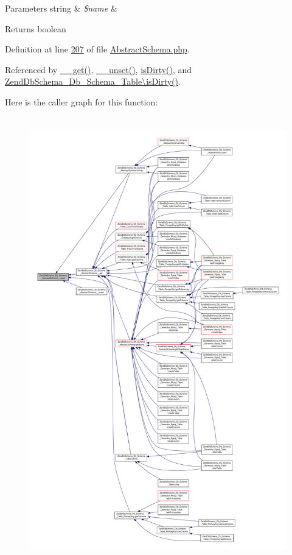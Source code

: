 \begin{DoxyParams}[1]{Parameters}
string & {\em \$name} & \\
\hline
\end{DoxyParams}
\begin{DoxyReturn}{Returns}
boolean 
\end{DoxyReturn}


Definition at line \hyperlink{AbstractSchema_8php_source_l00207}{207} of file \hyperlink{AbstractSchema_8php_source}{Abstract\-Schema.\-php}.



Referenced by \hyperlink{AbstractSchema_8php_source_l00193}{\-\_\-\-\_\-get()}, \hyperlink{AbstractSchema_8php_source_l00230}{\-\_\-\-\_\-unset()}, \hyperlink{AbstractSchema_8php_source_l00091}{is\-Dirty()}, and \hyperlink{Table_8php_source_l00365}{Zend\-Db\-Schema\-\_\-\-Db\-\_\-\-Schema\-\_\-\-Table\textbackslash{}is\-Dirty()}.



Here is the caller graph for this function\-:\nopagebreak
\begin{figure}[H]
\begin{center}
\leavevmode
\includegraphics[height=550pt]{classZendDbSchema__Db__Schema__AbstractSchema_ac4e121ba7932163eb1950fabe06fb9db_icgraph}
\end{center}
\end{figure}


